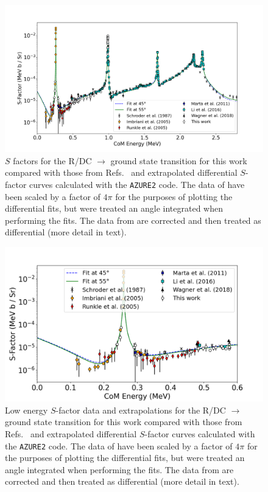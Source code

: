 \begin{figure}
\centering
\includegraphics[width=1.0\columnwidth]{./figures/data_and_fits_whole.png}
\caption{$S$ factors for the R/DC $\rightarrow$ ground state transition for this work compared with those from Refs.~\cite{Imbriani2005, Marta2011, Runkle2005, Schroder1987, Li2016, Wagner2018} and extrapolated differential $S$-factor curves calculated with the \texttt{AZURE2} code. The data of \cite{Imbriani2005, Runkle2005, Marta2011, Wagner2018} have been scaled by a factor of $4\pi$ for the purposes of plotting the differential fits, but were treated an angle integrated when performing the fits. The data from \citet{Schroder1987} are corrected \cite{Adelberger2011} and then treated as differential (more detail in text). }
\label{fig: sfactor_best_fit}
\end{figure}

\begin{figure}
\centering
\includegraphics[width=1.0\columnwidth]{./figures/data_and_fits_low.png}
\caption{Low energy $S$-factor data and extrapolations for the R/DC $\rightarrow$ ground state transition for this work compared with those from Refs.~\cite{Imbriani2005, Marta2011, Runkle2005, Schroder1987, Li2016, Wagner2018} and extrapolated differential $S$-factor curves calculated with the \texttt{AZURE2} code. The data of \cite{Imbriani2005, Runkle2005, Marta2011, Wagner2018} have been scaled by a factor of $4\pi$ for the purposes of plotting the differential fits, but were treated an angle integrated when performing the fits. The data from \citet{Schroder1987} are corrected \cite{Adelberger2011} and then treated as differential (more detail in text). }
\label{fig: sfactor_best_low}
\end{figure}


